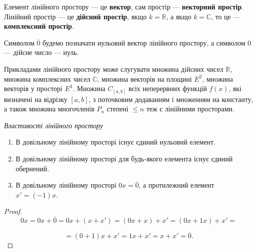 Елемент лінійного простору --- це \textbf{вектор}, сам простір ---
\textbf{векторний простір}. Лінійний простір --- це \textbf{дійсний простір}, якщо $k = \mathbb{R}$,
а якщо $k = \mathbb{C}$, то це --- \textbf{комплексний простір}.

\begin{remark}
	Символом $\overline{0}$ будемо позначати нульовий вектор лінійного
	простору, а символом 0 --- дійсне число --- нуль.
\end{remark}

Прикладами лінійного простору може слугувати множина дійсних чисел $\mathbb{R}$,
множина комплексних чисел $\mathbb{C}$, множина векторів на площині $E^2$, множина 
векторів у просторі $E^3$. Множина $C_{[a,b]}$ всіх неперервних функцій $f(x)$, які
визначені на відрізку $[a,b]$, з поточковим додаванням і множенням на константу, а
також множина многочленів $P_n$ степені $\leqslant n$ теж є лінійними просторами.

\textit{Властивості лінійного простору}
\begin{enumerate}
	\item В довільному лінійному просторі існує єдиний нульовий елемент.
	\item В довільному лінійному просторі для будь-якого елемента існує єдиний обернений.
	\item В довільному лінійному просторі $0 x = \overline{0}$, а протилежний елемент $x' = (-1)x$.
\end{enumerate}
\begin{proof}
	$$0x = 0 x + \overline{0} = 0 x + (x+x') = (0x + x) + x' = (0x + 1x) + x' = $$
	
	$$= (0 + 1)x + x' = 1x + x' = x + x' = \overline{0}.$$
\end{proof}

